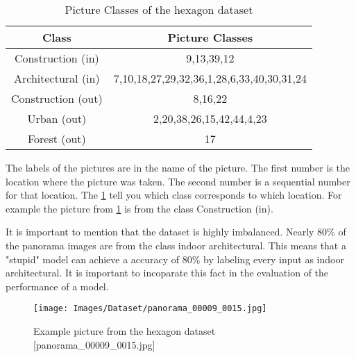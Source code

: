 \begin{table}
    \centering
    \begin{tabular}{cc}
    \toprule
    \textbf{Class}& \textbf{Picture Classes}\\ \midrule
    Construction (in) & 9,13,39,12 \\ \hline
    Architectural (in)& 7,10,18,27,29,32,36,1,28,6,33,40,30,31,24\\ \hline
    Construction (out)& 8,16,22\\ \hline
    Urban (out)& 2,20,38,26,15,42,44,4,23\\ \hline
    Forest (out)& 17\\
    \bottomrule
    \end{tabular}
    \caption{Picture Classes of the hexagon dataset
        \label{tab:dataset:piccoding}}
\end{table}

The labels of the pictures are in the name of the picture.
The first number is the location where the picture was taken.
The second number is a sequential number for that location.
The \cref{tab:dataset:piccoding} tell you which class corresponds to which location.
For example the picture from \cref{fig:dataset:examplepic} is from the class Construction (in).

It is important to mention that the dataset is highly imbalanced.
Nearly 80\% of the panorama images are from the class indoor architectural.
This means that a "stupid" model can achieve a accuracy of 80\% by labeling every input as indoor architectural.
It is important to incoparate this fact in the evaluation of the performance of a model.

\begin{figure}
    \centering
    \texttt{[image: Images/Dataset/panorama\_00009\_0015.jpg]}
    \caption{Example picture from the hexagon dataset [panorama\_00009\_0015.jpg]}
    \label{fig:dataset:examplepic}
\end{figure}